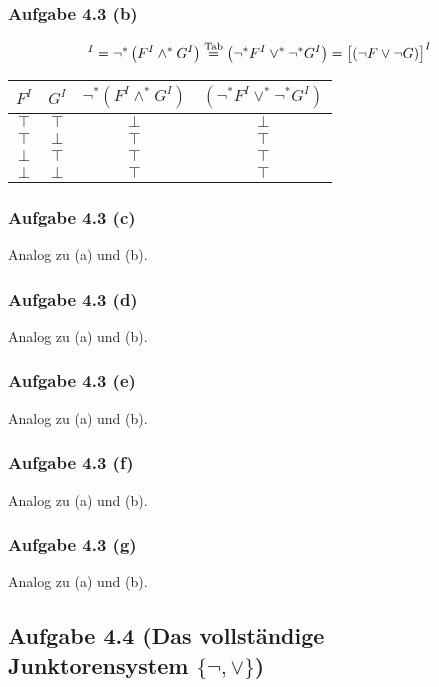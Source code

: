 \subsubsection{Aufgabe 4.3 (b)}
\begin{align*}
	[\neg(F\wedge G)]^I=\neg^\ast\left(F^I\wedge^\ast G^I\right)\stackeq{\text{Tab}}
	\left(\neg^\ast F^I\vee^\ast\neg^\ast G^I\right)=\big[(\neg F\vee\neg G)\big]^I
\end{align*}

\begin{tabular}{c|c||c|c}
	$F^I$ & $G^I$ & $\neg^\ast(F^I\wedge^\ast G^I)$ & $(\neg^\ast F^I\vee^\ast\neg^\ast G^I)$\\ \hline
	$\top$ & $\top$ & $\bot$ & $\bot$\\
	$\top$ & $\bot$ & $\top$ & $\top$\\
	$\bot$ & $\top$ & $\top$ & $\top$\\
	$\bot$ & $\bot$ & $\top$ & $\top$
\end{tabular}

\subsubsection{Aufgabe 4.3 (c)}
Analog zu (a) und (b).

\subsubsection{Aufgabe 4.3 (d)}
Analog zu (a) und (b).

\subsubsection{Aufgabe 4.3 (e)}
Analog zu (a) und (b).

\subsubsection{Aufgabe 4.3 (f)}
Analog zu (a) und (b).

\subsubsection{Aufgabe 4.3 (g)}
Analog zu (a) und (b).

\subsection{Aufgabe 4.4 (Das vollständige Junktorensystem \texorpdfstring{$\lbrace\neg, \vee\rbrace$}{lbrace neg,vee rbrace})}

